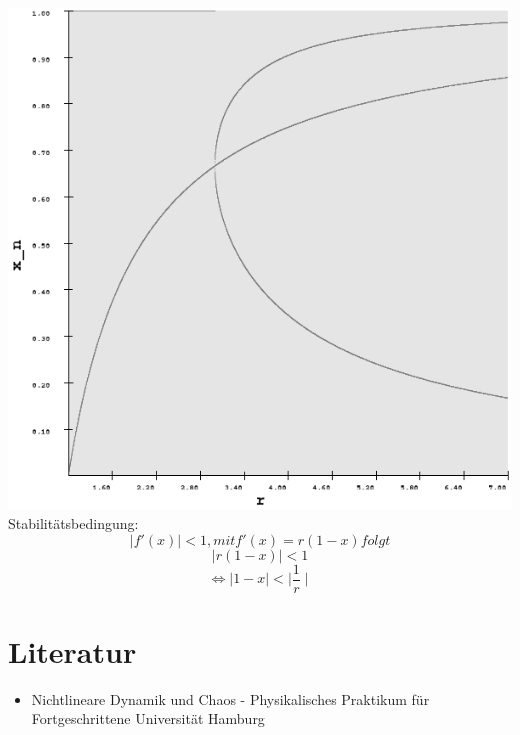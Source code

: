 \documentclass{scrartcl}
\begin{document}
\includegraphics[scale=0.3]{analy-periodenv}
Stabilitätsbedingung:
$$\mid f'(x)\mid <1, mit f'(x)=r(1-x) folgt$$
$$\mid r(1-x)\mid < 1$$
$$\Leftrightarrow \mid 1-x\mid < \mid \frac{1}{r}\mid$$

\section{ Literatur }
\begin{itemize} 
\item Nichtlineare Dynamik und Chaos - Physikalisches Praktikum für Fortgeschrittene Universität Hamburg
\end{itemize}
\end{document}
